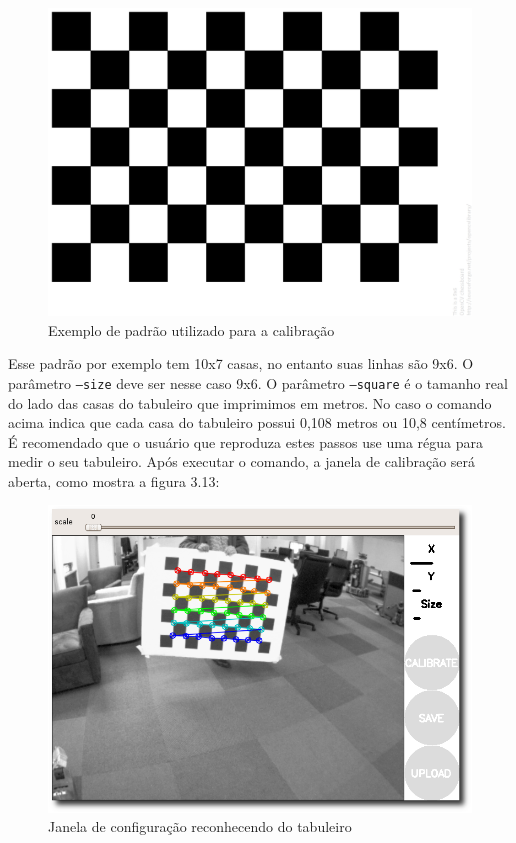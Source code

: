 \begin{figure}[!htb]
	\centering
		\includegraphics[width= \textwidth]{Imagens/figura3-3E3-12.png}
	\caption{Exemplo de padrão utilizado para a calibração}
	\label{fig3:12}
\end{figure}


Esse padrão por exemplo tem 10x7 casas, no entanto suas linhas são 9x6. O parâmetro \texttt{--size} deve ser nesse caso 9x6.
O parâmetro \texttt{--square} é o tamanho real do lado das casas do tabuleiro que imprimimos em metros. No caso o comando acima indica que cada casa do tabuleiro possui 0,108 metros ou 10,8 centímetros. É recomendado que o usuário que reproduza estes passos use uma régua para medir o seu tabuleiro.
Após executar o comando, a janela de calibração será aberta, como mostra a figura 3.13:

\begin{figure}[!htb]
	\centering
		\includegraphics[width= \textwidth]{Imagens/figura3-13.png}
	\caption{Janela de configuração reconhecendo do tabuleiro}
	\label{fig3:13}
\end{figure}

